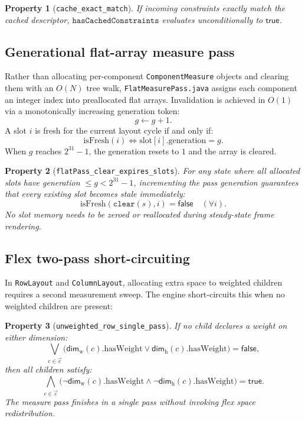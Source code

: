 \documentclass[11pt,a4paper]{article}
\newcommand{\Dimw}{\mathsf{dim}_{\mathrm{w}}}
\newcommand{\Dimh}{\mathsf{dim}_{\mathrm{h}}}
\newcommand{\lo}[1]{\texttt{#1}}       %
\newcommand{\jv}[1]{\texttt{#1}}       %
\theoremstyle{definition}
\theoremstyle{plain}
\newtheorem{property}{Property}[section]
\theoremstyle{remark}
\begin{document}
\begin{property}[\lo{cache\_exact\_match}]
If incoming constraints exactly match the cached descriptor,
$\lo{hasCachedConstraints}$ evaluates unconditionally to $\textsf{true}$.
\end{property}

\subsection{Generational flat-array measure pass}
\label{sec:opt-flatpass}

Rather than allocating per-component \jv{ComponentMeasure} objects and clearing
them with an $O(N)$ tree walk, \jv{FlatMeasurePass.java} assigns each component an
integer index into preallocated flat arrays. Invalidation is achieved in $O(1)$
via a monotonically increasing generation token:
\[
  g \gets g + 1.
\]
A slot $i$ is fresh for the current layout cycle if and only if:
\[
  \mathrm{isFresh}(i) \iff \mathrm{slot}[i].\mathrm{generation} = g.
\]
When $g$ reaches $2^{31}-1$, the generation resets to $1$ and the array is cleared.

\begin{property}[\texttt{flatPass\_clear\_expires\_slots}]
For any state where all allocated slots have generation $\leq g < 2^{31}-1$,
incrementing the pass generation guarantees that every existing slot becomes stale
immediately:
\[
  \mathrm{isFresh}(\lo{clear}(s), i) = \textsf{false} \quad (\forall i).
\]
No slot memory needs to be zeroed or reallocated during steady-state frame rendering.
\end{property}

\subsection{Flex two-pass short-circuiting}
\label{sec:opt-flex}

In \jv{RowLayout} and \jv{ColumnLayout}, allocating extra space to weighted
children requires a second measurement sweep. The engine short-circuits this
when no weighted children are present:

\begin{property}[\texttt{unweighted\_row\_single\_pass}]
If no child declares a weight on either dimension:
\[
  \bigvee_{c \in \vec{c}} \bigl(\Dimw(c).\mathrm{hasWeight} \lor \Dimh(c).\mathrm{hasWeight}\bigr) = \textsf{false},
\]
then all children satisfy:
\[
  \bigwedge_{c \in \vec{c}} \bigl(\neg \Dimw(c).\mathrm{hasWeight} \land \neg \Dimh(c).\mathrm{hasWeight}\bigr) = \textsf{true}.
\]
The measure pass finishes in a single pass without invoking flex space redistribution.
\end{property}
\end{document}
